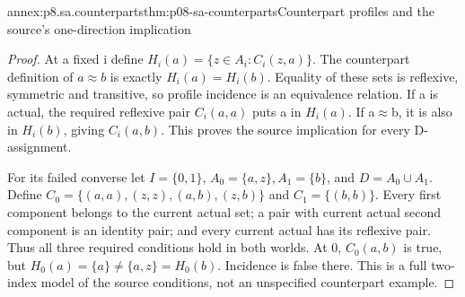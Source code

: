 \begin{annexitem}{annex:p8.sa.counterparts}{thm:p08-sa-counterparts}{Counterpart profiles and the source's one-direction implication}
\begin{proof}
At a fixed i define \(H_i(a)=\{z\in A_i:C_i(z,a)\}\).
The counterpart definition of \(a\approx b\) is exactly
\(H_i(a)=H_i(b)\). Equality of these sets is reflexive,
symmetric and transitive, so profile incidence is an equivalence
relation. If a is actual, the required reflexive pair
\(C_i(a,a)\) puts a in \(H_i(a)\). If a\(\approx\)b,
it is also in \(H_i(b)\), giving \(C_i(a,b)\).
This proves the source implication for every D-assignment.

For its failed converse let \(I=\{0,1\}\),
\(A_0=\{a,z\},A_1=\{b\}\), and
\(D=A_0\cup A_1\). Define
\(C_0=\{(a,a),(z,z),(a,b),(z,b)\}\) and
\(C_1=\{(b,b)\}\). Every first component belongs to the
current actual set; a pair with current actual second component
is an identity pair; and every current actual has its reflexive
pair. Thus all three required conditions hold in both worlds.
At 0, \(C_0(a,b)\) is true, but
\(H_0(a)=\{a\}\ne\{a,z\}=H_0(b)\). Incidence is
false there. This is a full two-index model of the source
conditions, not an unspecified counterpart example.
\end{proof}
\end{annexitem}
